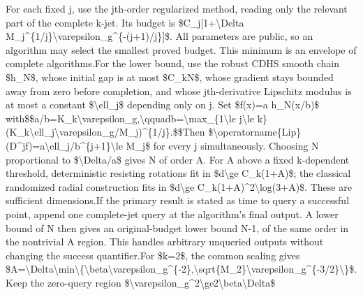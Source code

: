 \documentclass[10pt,a4paper]{article}
\begin{document}
\begingroup\raggedright\sloppy For each fixed j,\allowbreak{} use the jth-order regularized method,\allowbreak{} reading only the relevant part of the complete k-jet. Its budget is \$C\_\allowbreak{}j[1+\textbackslash{}Delta M\_\allowbreak{}j\textasciicircum{}\{1/\allowbreak{}j\}\textbackslash{}varepsilon\_\allowbreak{}g\textasciicircum{}\{-(j+1)/\allowbreak{}j\}]\$. All parameters are public,\allowbreak{} so an algorithm may select the smallest proved budget. This minimum is an envelope of complete algorithms.\newline{}\newline{}For the lower bound,\allowbreak{} use the robust CDHS smooth chain \$h\_\allowbreak{}N\$,\allowbreak{} whose initial gap is at most \$C\_\allowbreak{}kN\$,\allowbreak{} whose gradient stays bounded away from zero before completion,\allowbreak{} and whose jth-derivative Lipschitz modulus is at most a constant \$\textbackslash{}ell\_\allowbreak{}j\$ depending only on j. Set \$f(x)=\allowbreak{}a h\_\allowbreak{}N(x/\allowbreak{}b)\$ with\newline{}\$\$a/\allowbreak{}b=\allowbreak{}K\_\allowbreak{}k\textbackslash{}varepsilon\_\allowbreak{}g,\allowbreak{}\textbackslash{}qquad\newline{}b=\allowbreak{}\textbackslash{}max\_\allowbreak{}\{1\textbackslash{}le j\textbackslash{}le k\}(K\_\allowbreak{}k\textbackslash{}ell\_\allowbreak{}j\textbackslash{}varepsilon\_\allowbreak{}g/\allowbreak{}M\_\allowbreak{}j)\textasciicircum{}\{1/\allowbreak{}j\}.\$\$\newline{}Then \$\textbackslash{}operatorname\{Lip\}(D\textasciicircum{}jf)=\allowbreak{}a\textbackslash{}ell\_\allowbreak{}j/\allowbreak{}b\textasciicircum{}\{j+1\}\textbackslash{}le M\_\allowbreak{}j\$ for every j simultaneously. Choosing N proportional to \$\textbackslash{}Delta/\allowbreak{}a\$ gives N of order A. For A above a fixed k-dependent threshold,\allowbreak{} deterministic resisting rotations fit in \$d\textbackslash{}ge C\_\allowbreak{}k(1+A)\$;\allowbreak{} the classical randomized radial construction fits in \$d\textbackslash{}ge C\_\allowbreak{}k(1+A)\textasciicircum{}2\textbackslash{}log(3+A)\$. These are sufficient dimensions.\newline{}\newline{}If the primary result is stated as time to query a successful point,\allowbreak{} append one complete-jet query at the algorithm's final output. A lower bound of N then gives an original-budget lower bound N-1,\allowbreak{} of the same order in the nontrivial A region. This handles arbitrary unqueried outputs without changing the success quantifier.\newline{}\newline{}For \$k=\allowbreak{}2\$,\allowbreak{} the common scaling gives \$A=\allowbreak{}\textbackslash{}Delta\textbackslash{}min\textbackslash{}\{\textbackslash{}beta\textbackslash{}varepsilon\_\allowbreak{}g\textasciicircum{}\{-2\},\allowbreak{}\textbackslash{}sqrt\{M\_\allowbreak{}2\}\textbackslash{}varepsilon\_\allowbreak{}g\textasciicircum{}\{-3/\allowbreak{}2\}\textbackslash{}\}\$. Keep the zero-query region \$\textbackslash{}varepsilon\_\allowbreak{}g\textasciicircum{}2\textbackslash{}ge2\textbackslash{}beta\textbackslash{}Delta\$ 
\end{document}
